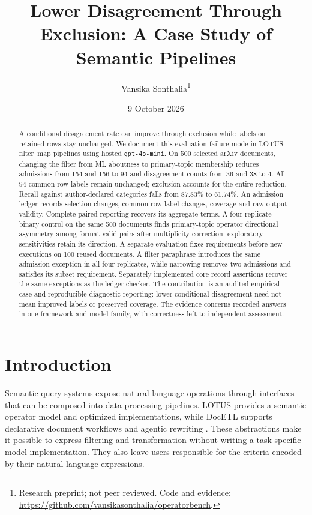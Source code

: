 \documentclass[11pt]{article}
\title{Lower Disagreement Through Exclusion: A Case Study of Semantic Pipelines}
\author{Vansika Sonthalia\thanks{Research preprint; not peer reviewed. Code and evidence: \url{https://github.com/vansikasonthalia/operatorbench}.}}
\date{9 October 2026}
\begin{document}
\maketitle
\begin{abstract}
A conditional disagreement rate can improve through exclusion while labels
on retained rows stay unchanged. We document this evaluation failure mode
in LOTUS filter--map pipelines using hosted \texttt{gpt-4o-mini}. On 500
selected arXiv documents, changing the filter from ML aboutness to
primary-topic membership reduces admissions from 154 and 156 to 94 and
disagreement counts from 36 and 38 to 4. All 94 common-row labels remain
unchanged; exclusion accounts for the entire reduction. Recall against
author-declared categories falls from 87.83\% to 61.74\%.
An admission ledger records selection changes, common-row label changes,
coverage and raw output validity. Complete paired reporting recovers its
aggregate terms. A four-replicate binary control on the same 500 documents
finds primary-topic operator directional asymmetry among format-valid pairs
after multiplicity correction; exploratory sensitivities retain its direction.
A separate evaluation fixes requirements before new executions on 100 reused
documents. A filter paraphrase introduces the same admission exception in
all four replicates, while narrowing removes two admissions and satisfies
its subset requirement. Separately implemented core record assertions
recover the same exceptions as the ledger checker.
The contribution is an audited empirical case and reproducible diagnostic
reporting: lower conditional disagreement need not mean improved labels or
preserved coverage. The evidence concerns recorded answers in one framework
and model family, with correctness left to independent assessment.
\end{abstract}

\section{Introduction}
\label{sec:introduction}
Semantic query systems expose natural-language operations through interfaces
that can be composed into data-processing pipelines. LOTUS provides a
semantic operator model and optimized implementations, while DocETL supports
declarative document workflows and agentic rewriting
\cite{lotus,docetl}. These abstractions make it possible to express filtering
and transformation without writing a task-specific model implementation.
They also leave users responsible for the criteria encoded by their
natural-language expressions.
\end{document}
